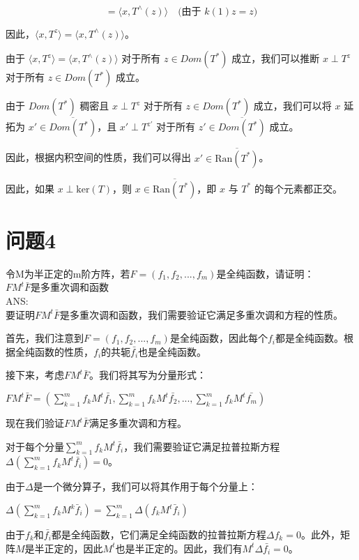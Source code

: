 \documentclass[12pt, a4paper, oneside]{ctexart}
\begin{document}
\begin{spacing}{2.0}
\[
= \langle x, T^{\land}(z) \rangle \quad \text{(由于 $k(1)z = z$)}
\]

因此，$\langle x, T^z \rangle = \langle x, T^{\land}(z) \rangle$。

由于 $\langle x, T^z \rangle = \langle x, T^{\land}(z) \rangle$ 对于所有 $z \in Dom(T^*)$ 成立，我们可以推断 $x \perp T^z$ 对于所有 $z \in Dom(T^*)$ 成立。

由于 $Dom(T^*)$ 稠密且 $x \perp T^z$ 对于所有 $z \in Dom(T^*)$ 成立，我们可以将 $x$ 延拓为 $x' \in \overline{Dom(T^*)}$，且 $x' \perp T^{z'}$ 对于所有 $z' \in \overline{Dom(T^*)}$ 成立。

因此，根据内积空间的性质，我们可以得出 $x' \in \overline{\text{Ran}(T^*)}$。

因此，如果 $x \perp \text{ker}(T)$，则 $x \in \overline{\text{Ran}(T^*)}$，即 $x$ 与 $T^*$ 的每个元素都正交。



\section{问题4}
令M为半正定的m阶方阵，若$F = (f_1, f_2, ... , f_m)$是全纯函数，请证明：\\
$FM ^t\bar{F}$是多重次调和函数
\\
ANS:\\
要证明$FM^t\bar{F}$是多重次调和函数，我们需要验证它满足多重次调和方程的性质。

首先，我们注意到$F = (f_1, f_2, ..., f_m)$是全纯函数，因此每个$f_i$都是全纯函数。根据全纯函数的性质，$f_i$的共轭$\bar{f_i}$也是全纯函数。

接下来，考虑$FM^t\bar{F}$。我们将其写为分量形式：

\begin{center}
    $\displaystyle FM^t\bar{F}=\left(\sum\limits_{k=1}^m f_kM^t\bar{f_1},\sum\limits_{k=1}^m f_kM^t\bar{f_2},...,\sum\limits_{k=1}^m f_kM^t\bar{f_m}\right)$
\end{center}
现在我们验证$FM^t\bar{F}$满足多重次调和方程。

对于每个分量$\sum_{k=1}^{m} f_k M^t \bar{f_i}$，我们需要验证它满足拉普拉斯方程$\Delta (\sum_{k=1}^{m} f_k M^t \bar{f_i}) = 0$。

由于$\Delta$是一个微分算子，我们可以将其作用于每个分量上：

\begin{center}
    $\displaystyle \Delta(\sum\limits_{k=1}^{m}f_kM^k\bar{f}_i)=\sum\limits_{k=1}^{m}\Delta(f_kM^t\bar{f}_i)$
\end{center}
由于$f_k$和$\bar{f_i}$都是全纯函数，它们满足全纯函数的拉普拉斯方程$\Delta f_k = 0$。此外，矩阵$M$是半正定的，因此$M^t$也是半正定的。因此，我们有$M^t \Delta \bar{f_i} = 0$。


\end{spacing}
\end{document}

